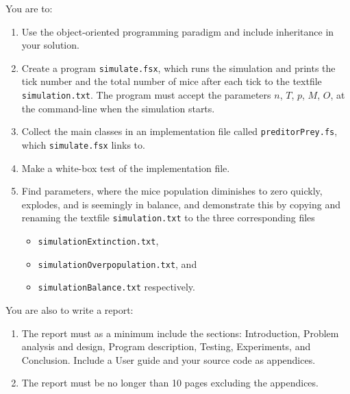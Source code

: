 You are to:
\begin{enumerate}
\item Use the object-oriented programming paradigm and include inheritance in your solution.
\item Create a program \lstinline[language=console]{simulate.fsx}, which runs the simulation and prints the tick number and the total number of mice after each tick to the textfile \lstinline[language=console]{simulation.txt}. The program must accept the parameters $n$, $T$, $p$, $M$, $O$, at the command-line when the simulation starts.
\item Collect the main classes in an implementation file called \lstinline[language=console]{preditorPrey.fs}, which \lstinline[language=console]{simulate.fsx} links to.
\item Make a white-box test of the implementation file.
\item Find parameters, where the mice population diminishes to zero quickly, explodes, and is seemingly in balance, and demonstrate this by copying and renaming the textfile \lstinline[language=console]{simulation.txt} to the three corresponding files
  \begin{itemize}
  \item \lstinline[language=console]{simulationExtinction.txt},
  \item \lstinline[language=console]{simulationOverpopulation.txt}, and
  \item \lstinline[language=console]{simulationBalance.txt} respectively.
  \end{itemize}
\end{enumerate}
You are also to write a report:
\begin{enumerate}[resume]
\item The report must as a minimum include
  the sections: Introduction, Problem analysis and design, Program
  description, Testing, Experiments, and Conclusion. Include a User
  guide and your source code as appendices.
\item The report must be
  no longer than 10 pages excluding the appendices.
\end{enumerate}

